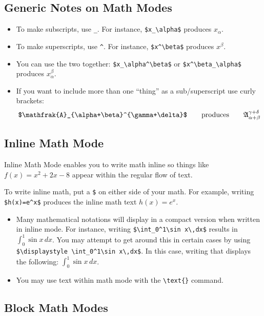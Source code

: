 \documentclass[letterpaper,twoside,10pt]{article}
\begin{document}
\subsection{Generic Notes on Math Modes}

\begin{itemize}
 \item To make subscripts, use \verb!_!. For instance, \verb!$x_\alpha$! produces $x_\alpha$.
\item To make superscripts, use \verb!^!. For instance, \verb!$x^\beta$! produces $x^\beta$.
\item You can use the two together: \verb!$x_\alpha^\beta$! or \verb!$x^\beta_\alpha$! produces $x^\beta_\alpha$.
\item If you want to include more than one ``thing'' as a sub/superscript use curly brackets:
\[
 \verb!$\mathfrak{A}_{\alpha+\beta}^{\gamma+\delta}$!\qquad\text{produces}\qquad \displaystyle\mathfrak{A}_{\alpha+\beta}^{\gamma+\delta}
\]

\end{itemize}


\subsection{Inline Math Mode}

Inline Math Mode enables you to write math inline so things like $f(x)=x^2+2x-8$ appear within the regular flow of text.

\bigbreak To write inline math, put a \verb!$! on either side of your math. For example, writing \verb!$h(x)=e^x$! produces the inline math text $h(x)=e^x$.

\begin{itemize}
 \item Many mathematical notations will display in a compact version when written in inline mode. For instance, writing \verb!$\int_0^1\sin x\,dx$! results in $\int_0^1\sin x\,dx$. You may attempt to get around this in certain cases by using \verb!$\displaystyle \int_0^1\sin x\,dx$!. In this case, writing that displays the following: $\displaystyle \int_0^1\sin x\,dx$.
 \item You may use text within math mode with the \verb!\text{}! command.
\end{itemize}

\subsection{Block Math Modes}
\end{document}
